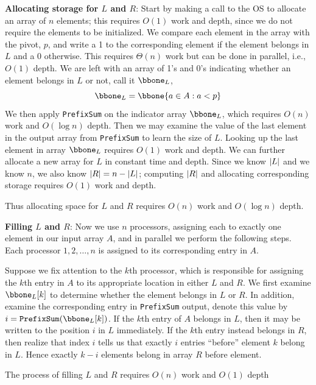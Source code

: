 \documentclass[11pt]{article}
\DeclareMathOperator{\PrefixSum}{\texttt{PrefixSum}}
\begin{document}
\textbf{Allocating storage for \(L\) and \(R\)}: Start by making a call to the OS to allocate an array
of \(n\) elements; this requires \(O(1)\) work and depth, since we do not require the elements
to be initialized. We compare each element in the array with the pivot, \(p\), and write a 1 to
the corresponding element if the element belongs in \(L\) and a 0 otherwise. This
requires \(\Theta(n)\) work but can be done in parallel, i.e., \(O(1)\) depth. We are left with an
array of 1's and 0's indicating whether an element belongs in \(L\) or not, call
it \(\bbone_L\),
\begin{equation*}
\bbone_L=\bbone\{a\in A:a<p\}
\end{equation*}
We then apply \texttt{PrefixSum} on the indicator array \(\bbone_L\), which requires \(O(n)\) work
and \(O(\log n)\) depth. Then we may examine the value of the last element in the output array
from \texttt{PrefixSum} to learn the size of \(L\). Looking up the last element in array \(\bbone_L\)
requires \(O(1)\) work and depth. We can further allocate a new array for \(L\) in constant time
and depth. Since we know \(\abs{L}\) and we know \(n\), we also know \(\abs{R}=n-\abs{L}\);
computing \(\abs{R}\) and allocating corresponding storage requires \(O(1)\) work and depth.

Thus allocating space for \(L\) and \(R\) requires \(O(n)\) work and \(O(\log n)\) depth.

\textbf{Filling \(L\) and \(R\)}: Now we use \(n\) processors, assigning each to exactly one element in
our input array \(A\), and in parallel we perform the following steps. Each
processor \(1,2,\dots,n\) is assigned to its corresponding entry in \(A\).

Suppose we fix attention to the \(k\)th processor, which is responsible for assigning
the \(k\)th entry in \(A\) to its appropriate location in either \(L\) and \(R\). We first
examine \(\bbone_L[k]\) to determine whether the element belongs in \(L\) or \(R\). In addition,
examine the corresponding entry in \texttt{PrefixSum} output, denote this value
by \(i=\PrefixSum(\bbone_L[k])\). If the \(k\)th entry of \(A\) belongs in \(L\), then it may be
written to the position \(i\) in \(L\) immediately. If the \(k\)th entry instead belongs
in \(R\), then realize that index \(i\) tells us that exactly \(i\) entries ``before''
element \(k\) belong in \(L\). Hence exactly \(k-i\) elements belong in array \(R\) before
element.

The process of filling \(L\) and \(R\) requires \(O(n)\) work and \(O(1)\) depth
\end{document}
